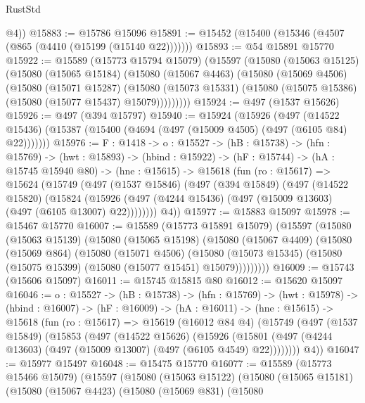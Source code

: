 \begin{lexlean}{RustStd}
\begin{coremodule}
        @4))
@15883 := @15786 @15096
@15891 := @15452 (@15400 (@15346 (@4507 (@865 (@4410 (@15199 (@15140 @22)))))))
@15893 := @54 @15891 @15770
@15922 := @15589
    (@15773 @15794 @15079)
    (@15597
      (@15080
        (@15063 @15125)
        (@15080
          (@15065 @15184)
          (@15080
            (@15067 @4463)
            (@15080
              (@15069 @4506)
              (@15080
                (@15071 @15287)
                (@15080
                  (@15073 @15331)
                  (@15080 (@15075 @15386) (@15080 (@15077 @15437) @15079)))))))))
@15924 := @497 (@1537 @15626)
@15926 := @497 (@394 @15797)
@15940 := @15924
    (@15926
      (@497 (@14522 @15436) (@15387 (@15400 (@4694 (@497 (@15009 @4505) (@497 (@6105 @84) @22)))))))
@15976 := {F : @1418} ->
  {o : @15527} ->
  (hB : @15738) ->
  (hfn : @15769) ->
  (hwt : @15893) ->
  (hbind : @15922) ->
  (hF : @15744) ->
  (hA : @15745 @15940 @80) ->
  (hne : @15615) ->
  @15618
    (fun (ro : @15617) =>
    @15624
      (@15749
        (@497
          (@1537 @15846)
          (@497
            (@394 @15849)
            (@497
              (@14522 @15820)
              (@15824
                (@15926 (@497 (@4244 @15436) (@497 (@15009 @13603) (@497 (@6105 @13007) @22))))))))
        @4))
@15977 := @15883 @15097
@15978 := @15467 @15770
@16007 := @15589
    (@15773 @15891 @15079)
    (@15597
      (@15080
        (@15063 @15139)
        (@15080
          (@15065 @15198)
          (@15080
            (@15067 @4409)
            (@15080
              (@15069 @864)
              (@15080
                (@15071 @4506)
                (@15080
                  (@15073 @15345)
                  (@15080 (@15075 @15399) (@15080 (@15077 @15451) @15079)))))))))
@16009 := @15743 (@15606 @15097)
@16011 := @15745 @15815 @80
@16012 := @15620 @15097
@16046 := {o : @15527} ->
  (hB : @15738) ->
  (hfn : @15769) ->
  (hwt : @15978) ->
  (hbind : @16007) ->
  (hF : @16009) ->
  (hA : @16011) ->
  (hne : @15615) ->
  @15618
    (fun (ro : @15617) =>
    @15619
      (@16012 @84 @4)
      (@15749
        (@497
          (@1537 @15849)
          (@15853
            (@497
              (@14522 @15626)
              (@15926
                (@15801 (@497 (@4244 @13603) (@497 (@15009 @13007) (@497 (@6105 @4549) @22))))))))
        @4))
@16047 := @15977 @15497
@16048 := @15475 @15770
@16077 := @15589
    (@15773 @15466 @15079)
    (@15597
      (@15080
        (@15063 @15122)
        (@15080
          (@15065 @15181)
          (@15080
            (@15067 @4423)
            (@15080
              (@15069 @831)
              (@15080

\end{coremodule}
\end{lexlean}
